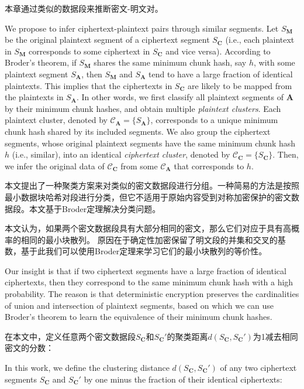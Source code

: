 本章通过类似的数据段来推断密文-明文对。

We propose to infer ciphertext-plaintext pairs through similar segments. Let $S_\mathbf{M}$ be the original plaintext segment of a ciphertext segment $S_\mathbf{C}$ (i.e., each plaintext in $S_\mathbf{M}$ corresponds to some ciphertext in $S_\mathbf{C}$ and vice versa). According to Broder's theorem, if $S_\mathbf{M}$ shares the same minimum chunk hash, say $h$, with some plaintext segment $S_\mathbf{A}$, then $S_\mathbf{M}$  and $S_\mathbf{A}$ tend to have a large fraction of identical plaintexts. This implies that the ciphertexts in $S_\mathbf{C}$ are likely to be mapped from the plaintexts in  $S_\mathbf{A}$. In other words, we first classify all plaintext segments of $\mathbf{A}$ by their minimum chunk hashes, and obtain multiple {\em plaintext clusters}. Each plaintext cluster, denoted by $\mathcal{C}_\mathbf{A} = \{ S_\mathbf{A} \}$, corresponds to a unique minimum chunk hash shared by its included segments. We also group the ciphertext segments, whose original plaintext segments have the same minimum chunk hash $h$ (i.e., similar), into an identical {\em ciphertext cluster}, denoted by $\mathcal{C}_\mathbf{C} = \{ S_\mathbf{C} \}$. Then, we infer the original data of $\mathcal{C}_\mathbf{C}$ from some $\mathcal{C}_\mathbf{A}$ that corresponds to  $h$.    

本文提出了一种聚类方案来对类似的密文数据段进行分组。一种简易的方法是按照最小数据块哈希对段进行分类，但它不适用于原始内容受到对称加密保护的密文数据段。本文基于Broder定理解决分类问题。
  
本文认为，如果两个密文数据段具有大部分相同的密文，那么它们对应于具有高概率的相同的最小块散列。 原因在于确定性加密保留了明文段的并集和交叉的基数，基于此我们可以使用Broder定理来学习它们的最小块散列的等价性。
  
Our insight is that if two ciphertext segments have a large fraction of identical ciphertexts, then  they correspond to the same minimum chunk hash with a high probability. The reason is that deterministic encryption preserves the cardinalities of union and intersection of plaintext segments, based on which we can use Broder's theorem to learn the equivalence of their minimum chunk hashes.    

在本文中，定义任意两个密文数据段$S_\mathbf{C}$和$S_\mathbf{C}'$的聚类距离$d(S_\mathbf{C},S_\mathbf{C}')$为1减去相同密文的分数：

In this work, we define the clustering distance $d(S_\mathbf{C}, S_\mathbf{C}')$ of any two ciphertext segments $S_\mathbf{C}$ and $S_\mathbf{C}'$ by one minus the fraction of their identical ciphertexts:

